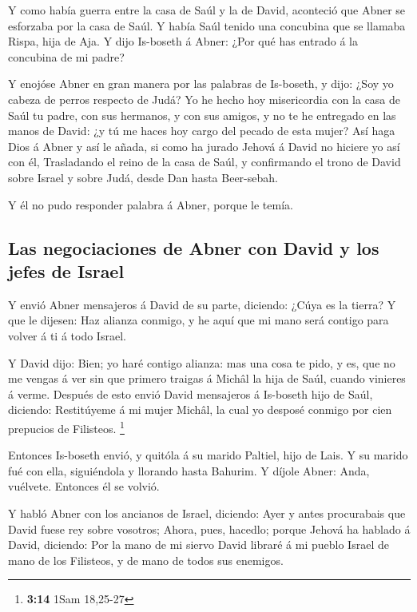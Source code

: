  Y como había guerra entre la casa de Saúl y la de David,
aconteció que Abner se esforzaba por la casa de Saúl.  Y
había Saúl tenido una concubina que se llamaba Rispa, hija de Aja. Y
dijo Is-boseth á Abner: ¿Por qué has entrado á la concubina de mi padre?

 Y enojóse Abner en gran manera por las palabras de
Is-boseth, y dijo: ¿Soy yo cabeza de perros respecto de Judá? Yo he
hecho hoy misericordia con la casa de Saúl tu padre, con sus hermanos, y
con sus amigos, y no te he entregado en las manos de David: ¿y tú me
haces hoy cargo del pecado de esta mujer?  Así haga Dios á
Abner y así le añada, si como ha jurado Jehová á David no hiciere yo así
con él,  Trasladando el reino de la casa de Saúl, y
confirmando el trono de David sobre Israel y sobre Judá, desde Dan hasta
Beer-sebah.

 Y él no pudo responder palabra á Abner, porque le temía.

\hypertarget{las-negociaciones-de-abner-con-david-y-los-jefes-de-israel}{%
\subsection{Las negociaciones de Abner con David y los jefes de
Israel}\label{las-negociaciones-de-abner-con-david-y-los-jefes-de-israel}}

 Y envió Abner mensajeros á David de su parte, diciendo:
¿Cúya es la tierra? Y que le dijesen: Haz alianza conmigo, y he aquí que
mi mano será contigo para volver á ti á todo Israel.

 Y David dijo: Bien; yo haré contigo alianza: mas una cosa
te pido, y es, que no me vengas á ver sin que primero traigas á Michâl
la hija de Saúl, cuando vinieres á verme.  Después de esto
envió David mensajeros á Is-boseth hijo de Saúl, diciendo: Restitúyeme á
mi mujer Michâl, la cual yo desposé conmigo por cien prepucios de
Filisteos. \footnote{\textbf{3:14} 1Sam 18,25-27}

 Entonces Is-boseth envió, y quitóla á su marido Paltiel,
hijo de Lais.  Y su marido fué con ella, siguiéndola y
llorando hasta Bahurim. Y díjole Abner: Anda, vuélvete. Entonces él se
volvió.

 Y habló Abner con los ancianos de Israel, diciendo: Ayer y
antes procurabais que David fuese rey sobre vosotros; 
Ahora, pues, hacedlo; porque Jehová ha hablado á David, diciendo: Por la
mano de mi siervo David libraré á mi pueblo Israel de mano de los
Filisteos, y de mano de todos sus enemigos.

